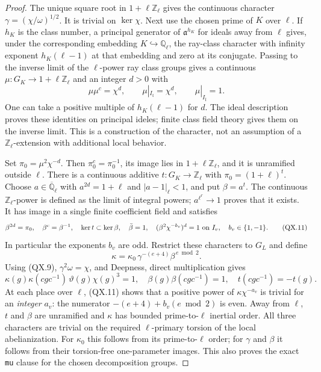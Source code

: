 \begin{proof}
The unique square root in $1+\ell\mathbb Z_\ell$ gives the
continuous character
$\gamma=(\chi/\omega)^{1/2}$.  It is trivial on $\ker\chi$.
Next use the chosen prime of $K$ over $\ell$.  If $h_K$ is the
class number, a principal generator of $\mathfrak a^{h_K}$
for ideals away from $\ell$ gives, under the corresponding
embedding $K\hookrightarrow\mathbb Q_\ell$, the ray-class
character with infinity exponent $h_K(\ell-1)$ at that
embedding and zero at its conjugate.  Passing to the inverse
limit of the $\ell$-power ray class groups gives a continuous
$\mu:G_K\to1+\ell\mathbb Z_\ell$ and an integer $d>0$ with
\[
 \mu\mu^c=\chi^d,\qquad
 \mu|_{I_{\mathfrak l}}=\chi^d,\qquad
 \mu|_{I_{\bar{\mathfrak l}}}=1 .
 \tag{QX.10}
\]
One can take a positive multiple of $h_K(\ell-1)$ for $d$.
The ideal description proves these identities on principal
ideles; finite class field theory gives them on the inverse
limit.  This is a construction of the character, not an
assumption of a $\mathbb Z_\ell$-extension with additional
local behavior.

Set $\pi_0=\mu^2\chi^{-d}$.  Then $\pi_0^c=\pi_0^{-1}$, its
image lies in $1+\ell\mathbb Z_\ell$, and it is unramified
outside $\ell$.  There is a continuous additive
$t:G_K\to\mathbb Z_\ell$ with $\pi_0=(1+\ell)^t$.
Choose $a\in\overline{\mathbb Q}_\ell$ with
$a^{2d}=1+\ell$ and $|a-1|_\ell<1$, and put $\beta=a^t$.
The continuous $\mathbb Z_\ell$-power is defined as the limit
of integral powers; $a^{\ell^r}\to1$ proves that it exists.
It has image in a single finite coefficient field and satisfies
\[
 \beta^{2d}=\pi_0,\quad \beta^c=\beta^{-1},\quad
 \ker t\subset\ker\beta,\quad \bar\beta=1,\quad
 (\beta^2\chi^{-b_v})^d=1\ \hbox{on }I_v,\quad b_v\in\{1,-1\}.
 \tag{QX.11}
\]
In particular the exponents $b_v$ are odd.
Restrict these characters to $G_L$ and define
\[
        \kappa=\kappa_0\,\gamma^{-(e+4)}
                              \beta^{\,e\bmod2}.
        \tag{QX.12}
\]
Using (QX.9), $\gamma^2\omega=\chi$, and Deepness, direct
multiplication gives
\[
 \kappa(g)\kappa(cgc^{-1})\,\vartheta(g)\chi(g)^3=1,
 \quad \beta(g)\beta(cgc^{-1})=1,\quad
                         t(cgc^{-1})=-t(g).
 \tag{QX.13}
\]
At each place over $\ell$, (QX.11) shows that a positive power
of $\kappa\chi^{-a_v}$ is trivial for an \emph{integer} $a_v$:
the numerator $-(e+4)+b_v(e\bmod2)$ is even.
Away from $\ell$, $t$ and $\beta$ are unramified and
$\kappa$ has bounded prime-to-$\ell$ inertial order.
All three characters are trivial on the required
$\ell$-primary torsion of the local abelianization.  For
$\kappa_0$ this follows from its prime-to-$\ell$ order;
for $\gamma$ and $\beta$ it follows from their torsion-free
one-parameter images.  This also proves the exact
\texttt{mu} clause for the chosen decomposition groups.


\end{proof}
